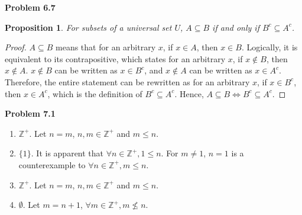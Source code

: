 \documentclass{article}
\newtheorem{prop}[thm]{Proposition}
\begin{document}
\textbf{Problem 6.7}
\begin{prop}
    For subsets of a universal set $U$, $A \subseteq B$ if and only if $B^c \subseteq A^c$.
\end{prop}
\begin{proof}
    $A \subseteq B$ means that for an arbitrary $x$, if $x \in A$, then $x \in B$. 
    Logically, it is equivalent to its contrapositive, which states for an arbitrary $x$, if $x \not \in B$, then $x \not \in A$.
    $x \not \in B$ can be written as $x \in B^c$, and $x \not \in A$ can be written as $x \in A^c$.
    Therefore, the entire statement can be rewritten as for an arbitrary $x$, if $x \in B^c$, then $x \in A^c$, which is the definition of $B^c \subseteq A^c$.
    Hence, $A \subseteq B \Leftrightarrow B^c \subseteq A^c$.
\end{proof}
\bigbreak

\textbf{Problem 7.1}
\begin{enumerate}[label={(\roman*)}]
    \item $\mathbb{Z^+}$. Let $n =m$, $n, m \in \mathbb{Z^+}$ and $m \le n$.
    \item $\{1\}$. It is apparent that $\forall n \in \mathbb{Z^+}, 1 \le n$. For $m \neq 1$, $n = 1$ is a counterexample to $\forall n \in \mathbb{Z^+}, m \le n$.
    \item $\mathbb{Z^+}$. Let $n =m$, $n, m \in \mathbb{Z^+}$ and $m \le n$.
    \item $\emptyset$. Let $m=n+1$, $\forall m \in \mathbb{Z^+}, m \not\le n$.
\end{enumerate}
\bigbreak
\end{document}
